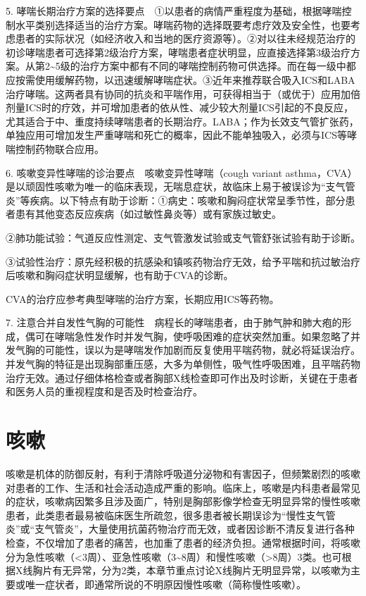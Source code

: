 5.
哮喘长期治疗方案的选择要点　①以患者的病情严重程度为基础，根据哮喘控制水平类别选择适当的治疗方案。哮喘药物的选择既要考虑疗效及安全性，也要考虑患者的实际状况（如经济收入和当地的医疗资源等）。②对以往未经规范治疗的初诊哮喘患者可选择第2级治疗方案，哮喘患者症状明显，应直接选择第3级治疗方案。从第2\textasciitilde{}5级的治疗方案中都有不同的哮喘控制药物可供选择。而在每一级中都应按需使用缓解药物，以迅速缓解哮喘症状。③近年来推荐联合吸入ICS和LABA治疗哮喘。这两者具有协同的抗炎和平喘作用，可获得相当于（或优于）应用加倍剂量ICS时的疗效，并可增加患者的依从性、减少较大剂量ICS引起的不良反应，尤其适合于中、重度持续哮喘患者的长期治疗。LABA；作为长效支气管扩张药，单独应用可增加发生严重哮喘和死亡的概率，因此不能单独吸入，必须与ICS等哮喘控制药物联合应用。

6. 咳嗽变异性哮喘的诊治要点　咳嗽变异性哮喘（cough variant
asthma，CVA）是以顽固性咳嗽为唯一的临床表现，无喘息症状，故临床上易于被误诊为“支气管炎”等疾病。以下特点有助于诊断：①病史：咳嗽和胸闷症状常呈季节性，部分患者患有其他变态反应疾病（如过敏性鼻炎等）或有家族过敏史。

②肺功能试验：气道反应性测定、支气管激发试验或支气管舒张试验有助于诊断。

③试验性治疗：原先经积极的抗感染和镇咳药物治疗无效，给予平喘和抗过敏治疗后咳嗽和胸闷症状明显缓解，也有助于CVA的诊断。

CVA的治疗应参考典型哮喘的治疗方案，长期应用ICS等药物。

7.
注意合并自发性气胸的可能性　病程长的哮喘患者，由于肺气肿和肺大疱的形成，偶可在哮喘急性发作时并发气胸，使呼吸困难的症状突然加重。如果忽略了并发气胸的可能性，误以为是哮喘发作加剧而反复使用平喘药物，就必将延误治疗。并发气胸的特征是出现胸部重压感，大多为单侧性，吸气性呼吸困难，且平喘药物治疗无效。通过仔细体格检查或者胸部X线检查即可作出及时诊断，关键在于患者和医务人员的重视程度和是否及时检查治疗。

\section{咳嗽}

咳嗽是机体的防御反射，有利于清除呼吸道分泌物和有害因子，但频繁剧烈的咳嗽对患者的工作、生活和社会活动造成严重的影响。临床上，咳嗽是内科患者最常见的症状，咳嗽病因繁多且涉及面广，特别是胸部影像学检查无明显异常的慢性咳嗽患者，此类患者最易被临床医生所疏忽，很多患者被长期误诊为“慢性支气管炎”或“支气管炎”，大量使用抗菌药物治疗而无效，或者因诊断不清反复进行各种检查，不仅增加了患者的痛苦，也加重了患者的经济负担。通常根据时间，将咳嗽分为急性咳嗽（\textless{}3周）、亚急性咳嗽（3\textasciitilde{}8周）和慢性咳嗽（\textgreater{}8周）3类。也可根据X线胸片有无异常，分为2类，本章节重点讨论X线胸片无明显异常，以咳嗽为主要或唯一症状者，即通常所说的不明原因慢性咳嗽（简称慢性咳嗽）。


